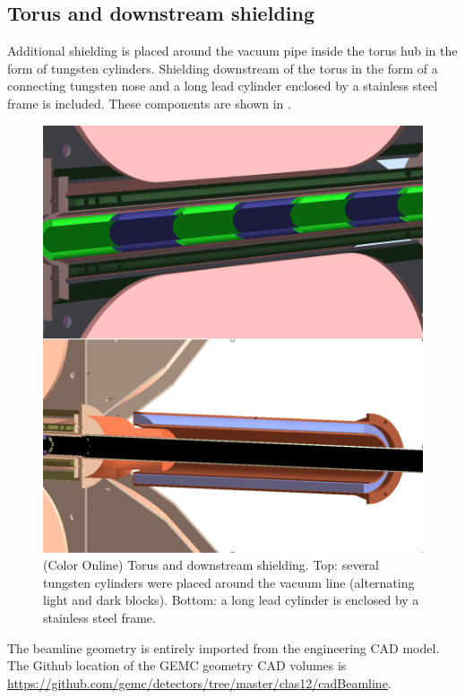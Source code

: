 \subsection{Torus and downstream shielding}
Additional shielding is placed around the vacuum pipe inside the torus hub in the form of tungsten cylinders.
Shielding downstream of the torus in the form of a connecting tungsten nose and a long lead cylinder enclosed
by a stainless steel frame is included. These components are shown in .

\begin{figure}
	\centering
	\includegraphics[width=0.98\columnwidth,keepaspectratio]{img/downstreamShielding.png}
	\caption{(Color Online) Torus and downstream shielding. Top: several tungsten cylinders were placed around the vacuum line
			 (alternating light and dark blocks).
             Bottom: a long lead cylinder is enclosed by a stainless steel frame.}
	\label{fig:downstreamShielding}
\end{figure}


The beamline geometry is entirely imported from the engineering CAD model.
The Github location of the GEMC geometry CAD volumes is \url{https://github.com/gemc/detectors/tree/master/clas12/cadBeamline}.

